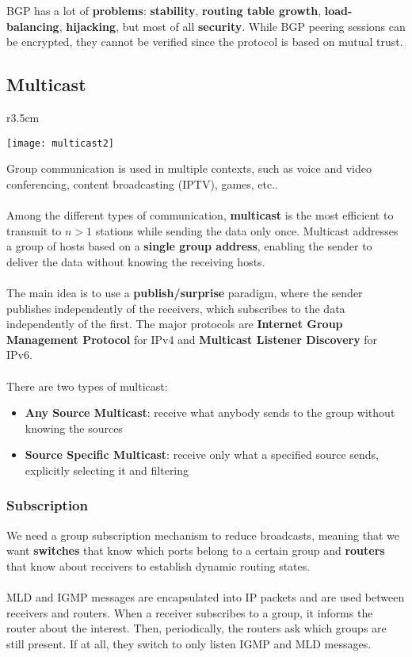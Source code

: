 BGP has a lot of \textbf{problems}: \textbf{stability}, \textbf{routing table growth}, \textbf{load-balancing}, \textbf{hijacking}, but most of all \textbf{security}. While BGP peering sessions can be encrypted, they cannot be verified since the protocol is based on mutual trust.
\newpage
\subsection{Multicast}
\begin{wrapfigure}[12]{r}{3.5cm}
	\vspace{-1cm}
	\begin{center}
		\texttt{[image: multicast2]}
	\end{center}
\end{wrapfigure}
Group communication is used in multiple contexts, such as voice and video conferencing, content broadcasting (IPTV), games, etc..\\\\
Among the different types of communication, \textbf{multicast} is the most efficient to transmit to $n>1$ stations while sending the data only once. Multicast addresses a group of hosts based on a \textbf{single group address}, enabling the sender to deliver the data without knowing the receiving hosts.\\\\
The main idea is to use a \textbf{publish/surprise} paradigm, where the sender publishes independently of the receivers, which subscribes to the data independently of the first. The major protocols are \textbf{Internet Group Management Protocol} for IPv4 and \textbf{Multicast Listener Discovery} for IPv6.\\\\
There are two types of multicast:
\begin{itemize}
	\item \textbf{Any Source Multicast}: receive what anybody sends to the group without knowing the sources
	\item \textbf{Source Specific Multicast}: receive only what a specified source sends, explicitly selecting it and filtering
\end{itemize}

\subsubsection{Subscription}
We need a group subscription mechanism to reduce broadcasts, meaning that we want \textbf{switches} that know which ports belong to a certain group and \textbf{routers} that know about receivers to establish dynamic routing states.\\\\
MLD and IGMP messages are encapsulated into IP packets and are used between receivers and routers. When a receiver subscribes to a group, it informs the router about the interest. Then, periodically, the routers ask which groups are still present. If at all, they switch to only listen IGMP and MLD messages.

